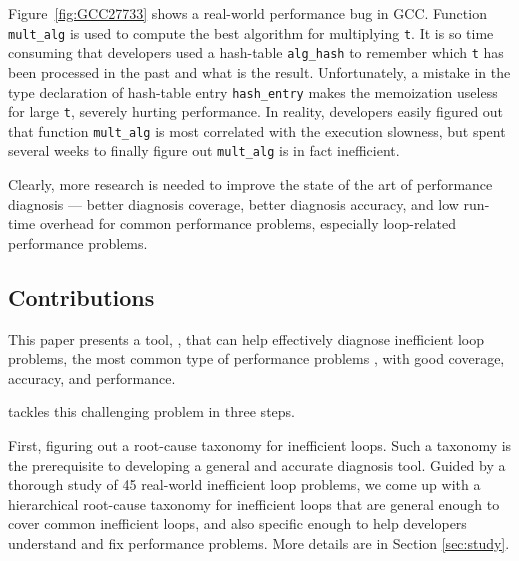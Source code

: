 Figure~\ref{fig:GCC27733} shows a real-world performance bug in GCC. 
Function \texttt{mult\_alg} is used to compute the best algorithm for 
multiplying \texttt{t}. It is so time consuming that developers used a
hash-table
\texttt{alg\_hash} to remember which \texttt{t} has been processed
in the past and what is the result. 
Unfortunately, a mistake in the type declaration of hash-table
entry \texttt{hash\_entry} makes the memoization useless for large \texttt{t},
severely hurting performance.
In reality, developers easily figured out that function
\texttt{mult\_alg} is most correlated with the execution slowness, but
spent several weeks to finally figure out \texttt{mult\_alg} is in fact
inefficient.

Clearly, more research is needed to improve the state of the art of performance
diagnosis --- better diagnosis
coverage, better diagnosis accuracy, and low run-time
overhead for common performance problems,
especially loop-related performance problems.


\subsection{Contributions}
This paper presents a tool, \Tool, that can help effectively diagnose
inefficient loop problems, the most common type of performance problems
\cite{SongOOPSLA2014,PerfBug}, with good coverage, accuracy, and performance.

\Tool tackles this challenging problem in three steps.

First, figuring out a root-cause taxonomy for inefficient loops.
Such a taxonomy is the prerequisite to developing a general and accurate
diagnosis tool. Guided by a thorough study of 45 real-world inefficient
loop problems, we come up with a hierarchical root-cause taxonomy for
inefficient loops that are
general enough to cover
common inefficient loops, and also specific enough to help developers understand
and fix performance problems. More details are
in Section \ref{sec:study}.
 
